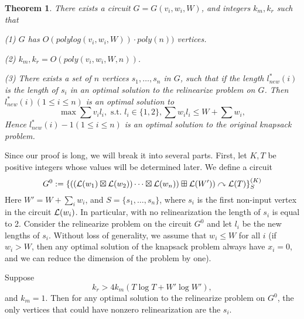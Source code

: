 \documentclass[11pt]{article} %
\theoremstyle{plain}
\newtheorem{theorem}{Theorem}
\theoremstyle{definition}
\begin{document}
\iffalse
{\color{red} Hao: one SODA reviewer pointed out a mistake. I think I can fix it by letting 
$M := W + \sum w_i + \sum_i v_i$. Take $T = 2M\log M$, $k_r = 6 M \log M \log(M \log M)$, and $K = 4 \log(M \log M)$. 
In this case, $K$ is still logarithm in the $v_i$ and $W$'s. We can verify that $KT > k_r$, $k_r > T\log T + W' \log W'$. Moreover, we have $Kr_i - k_r \leq 4 \log(M \log M) M \log M - k_r \leq -2 M \log M \log(M\log M) < -M < v_i$, for all $i$. So in the proof we don't have to scale up $K$.}
\fi
\begin{theorem} \label{thm}
There exists a circuit $G = G(v_i, w_i, W)$, and integers $k_m, k_r$ such that 

(1) $G$ has  $O(polylog(v_i, w_i, W) ) \cdot poly(n))$ vertices. 

(2) $k_m, k_r = O( poly(v_i, w_i, W, n))$. 

(3) There exists a set of $n$ vertices $s_1, \ldots, s_n$ in $G$, such that if the length $l_{new}^*(i)$ is the length of $s_i$ in an optimal solution to the relinearize problem on $G$. Then $l_{new}^*(i) (1 \leq i \leq n)$ is an optimal solution to 
\[
\max \sum v_i l_i,  \mbox{ s.t. }  l_i \in \{1, 2\}, \sum w_i l_i \leq W + \sum w_i, 
\]
Hence $l_{new}^*(i) -1 (1 \leq i \leq n)$ is an optimal  solution to the original knapsack problem. 
\end{theorem}
 
  
 
Since our proof is long, we will break it into several parts. First, let $K, T$ be positive integers whose values will be determined later. We  define a circuit 
 \[
 	G^{0}:= \{ ((\mathcal{L}(w_1) \boxtimes \mathcal{L}(w_2) ) \cdots \boxtimes \mathcal{L}(w_n) ) \boxplus \mathcal{L}(W') ) \curvearrowright \mathcal{L}(T) \}_S ^{(K)}
 \]
Here $W' = W + \sum_i w_i$, and $S = \{s_1, \ldots, s_n\}$, where $s_i$ is the first non-input vertex in the circuit $\mathcal{L}(w_i)$. In particular, with no relinearization the length of $s_i$ is equal to 2. Consider the relinearize problem on the circuit $G^0$ and let $l_i$ be the new lengths of $s_i$. Without loss of generality,  we assume that $w_i \leq W$ for all $i$ (if $w_i> W$,  then  any optimal solution of the knapsack problem always have $x_i = 0$, and we can reduce the dimension of the problem by one). 

\begin{lemma} \label{lem: constraint}
Suppose $$k_r >  4k_m(T\log T +W' \log W'),$$  and $k_m =1$. Then for any optimal solution to the relinearize problem on $G^0$, the only vertices that could have nonzero relinearization are the $s_i$. 
\end{lemma}
\end{document}
